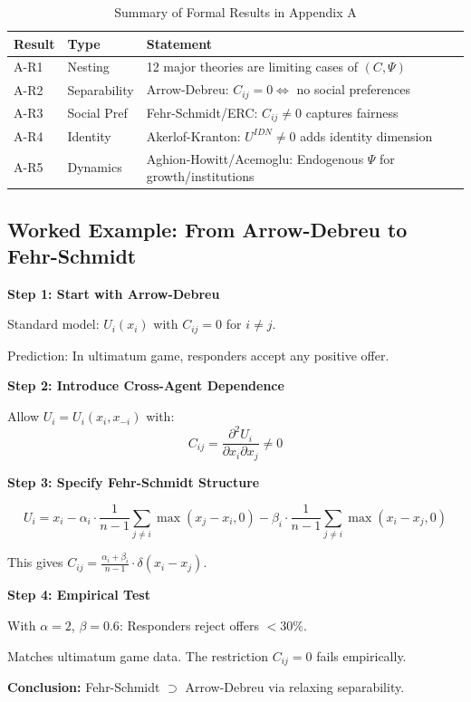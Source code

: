 \begin{table}[htbp]
\centering
\caption{Summary of Formal Results in Appendix A}
\label{tab:A-results}
\renewcommand{\arraystretch}{1.2}
\begin{tabular}{@{}llp{7cm}@{}}
\toprule
\textbf{Result} & \textbf{Type} & \textbf{Statement} \\
\midrule
A-R1 & Nesting & 12 major theories are limiting cases of $(C, \Psi)$ \\
A-R2 & Separability & Arrow-Debreu: $C_{ij} = 0 \Leftrightarrow$ no social preferences \\
A-R3 & Social Pref & Fehr-Schmidt/ERC: $C_{ij} \neq 0$ captures fairness \\
A-R4 & Identity & Akerlof-Kranton: $U^{IDN} \neq 0$ adds identity dimension \\
A-R5 & Dynamics & Aghion-Howitt/Acemoglu: Endogenous $\Psi$ for growth/institutions \\
\bottomrule
\end{tabular}
\end{table}


\subsection{Worked Example: From Arrow-Debreu to Fehr-Schmidt}
\label{sec:A-example}

\begin{tcolorbox}[colback=blue!5!white, colframe=blue!75!black,
    title=\textbf{Worked Example: Relaxing Separability}]

\textbf{Step 1: Start with Arrow-Debreu}

Standard model: $U_i(x_i)$ with $C_{ij} = 0$ for $i \neq j$.

Prediction: In ultimatum game, responders accept any positive offer.

\textbf{Step 2: Introduce Cross-Agent Dependence}

Allow $U_i = U_i(x_i, x_{-i})$ with:
\[
C_{ij} = \frac{\partial^2 U_i}{\partial x_i \partial x_j} \neq 0
\]

\textbf{Step 3: Specify Fehr-Schmidt Structure}

\[
U_i = x_i - \alpha_i \cdot \frac{1}{n-1} \sum_{j \neq i} \max(x_j - x_i, 0)
     - \beta_i \cdot \frac{1}{n-1} \sum_{j \neq i} \max(x_i - x_j, 0)
\]

This gives $C_{ij} = \frac{\alpha_i + \beta_i}{n-1} \cdot \delta(x_i - x_j)$.

\textbf{Step 4: Empirical Test}

With $\alpha = 2$, $\beta = 0.6$: Responders reject offers $< 30\%$.

Matches ultimatum game data. The restriction $C_{ij} = 0$ fails empirically.

\textbf{Conclusion:} Fehr-Schmidt $\supset$ Arrow-Debreu via relaxing separability.

\end{tcolorbox}

